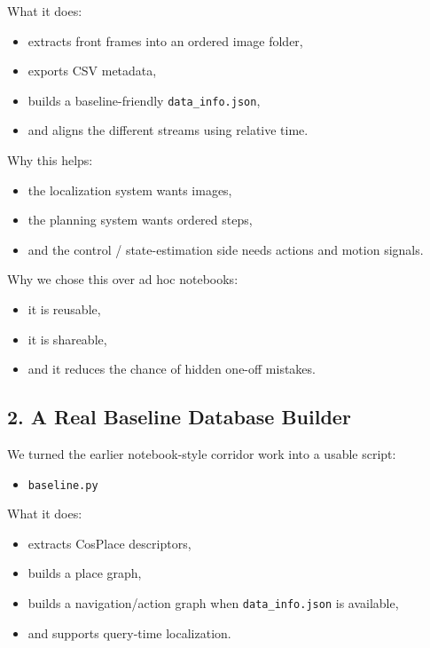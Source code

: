 \documentclass[11pt,a4paper]{article}
\begin{document}
What it does:

\begin{itemize}[nosep]
  \item extracts front frames into an ordered image folder,
  \item exports CSV metadata,
  \item builds a baseline-friendly \texttt{data\_info.json},
  \item and aligns the different streams using relative time.
\end{itemize}

Why this helps:

\begin{itemize}[nosep]
  \item the localization system wants images,
  \item the planning system wants ordered steps,
  \item and the control / state-estimation side needs actions and motion
        signals.
\end{itemize}

Why we chose this over ad hoc notebooks:

\begin{itemize}[nosep]
  \item it is reusable,
  \item it is shareable,
  \item and it reduces the chance of hidden one-off mistakes.
\end{itemize}


\subsection{2. A Real Baseline Database Builder}

We turned the earlier notebook-style corridor work into a usable script:

\begin{itemize}[nosep]
  \item \texttt{baseline.py}
\end{itemize}

What it does:

\begin{itemize}[nosep]
  \item extracts CosPlace descriptors,
  \item builds a place graph,
  \item builds a navigation/action graph when \texttt{data\_info.json} is
        available,
  \item and supports query-time localization.
\end{itemize}
\end{document}
